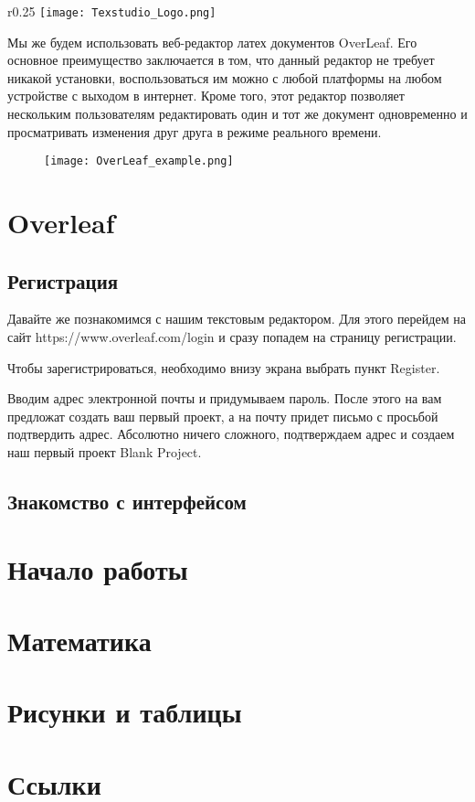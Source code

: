     \begin{wrapfigure}{r}{0.25\textwidth}
        \centering
        \texttt{[image: Texstudio\_Logo.png]}
        \caption{}
    \end{wrapfigure}



    Мы же будем использовать веб-редактор латех документов OverLeaf. Его основное преимущество заключается в том, что данный редактор не требует никакой установки, воспользоваться им можно с любой платформы на любом устройстве с выходом в интернет.
    Кроме того, этот редактор позволяет нескольким пользователям редактировать один и тот же документ одновременно и просматривать изменения друг друга в режиме реального времени.

    \begin{figure}[h!]
        \centering
        \texttt{[image: OverLeaf\_example.png]}
        \caption{}
        \label{OverLeaf_example}
    \end{figure}

    \section{Overleaf}

    \subsection{Регистрация}

    Давайте же познакомимся с нашим текстовым редактором. Для этого перейдем на сайт 
    https://www.overleaf.com/login и сразу попадем на страницу регистрации. 

    
    Чтобы зарегистрироваться, необходимо внизу экрана выбрать пункт Register.


    Вводим адрес электронной почты и придумываем пароль. После этого на вам предложат создать ваш первый проект, а на почту придет письмо с просьбой подтвердить адрес. Абсолютно ничего сложного,
    подтверждаем адрес и создаем наш первый проект Blank Project.


    \subsection{Знакомство с интерфейсом}

    \section{Начало работы}
    \section{Математика}
    \section{Рисунки и таблицы}
    \section{Ссылки}
